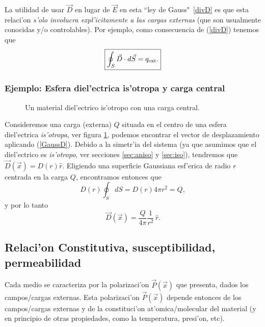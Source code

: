 La utilidad de usar $\vec{D}$ en lugar de $\vec{E}$ en esta ``ley de Gauss"
\,\eqref{divD} es que esta relaci'on \textit{s'olo involucra expl'icitamente a las cargas externas} (que son usualmente conocidas y/o controlables). Por ejemplo, como consecuencia de (\ref{divD}) tenemos que
\begin{equation}
 \boxed{\oint_S \vec{D}\cdot d\vec{S}=q_{\rm ext}.} \label{GaussD}
\end{equation}

\subsubsection{Ejemplo: Esfera diel'ectrica is'otropa y carga central}
\begin{figure}[!h]
\centerline{}
\caption{Un material diel'ectrico is'otropo con una carga central.}
\label{diel02}
\end{figure}
Consideremos una carga (externa) $Q$ situada en el centro de una
esfera diel'ectrica \textit{is'otropa}, ver figura \ref{diel02}, podemos encontrar el vector de desplazamiento aplicando (\ref{GaussD}). Debido a la simetr'ia del sistema (ya que asumimos que el diel'ectrico es \textit{is'otropo}, ver secciones \ref{sec:aniso} y \ref{sec:iso}), tendremos que $\vec{D}(\vec{x})=D(r)\hat{r}$. Eligiendo una superficie Gaussiana esf'erica de radio $r$ centrada en la carga $Q$, encontramos entonces que
\begin{equation}
 D(r)\oint_S dS=D(r)4\pi r^2=Q,
\end{equation}
y por lo tanto
\begin{equation}
 \vec{D}(\vec{x})=\frac{Q}{4\pi}\frac{1}{r^2}\,\hat{r}.
\end{equation}


\subsection{Relaci'on Constitutiva, susceptibilidad, permeabilidad}

Cada medio se caracteriza por la polarizaci'on $\vec{P}(\vec{x})$ que presenta,
dados los campos/cargas externas. Esta polarizaci'on $\vec{P}(\vec{x})$ depende
entonces de los campos/cargas externas y de la constituci'on at'omica/molecular
del material (y en principio de otras propiedades, como la temperatura,
presi'on, etc). 

